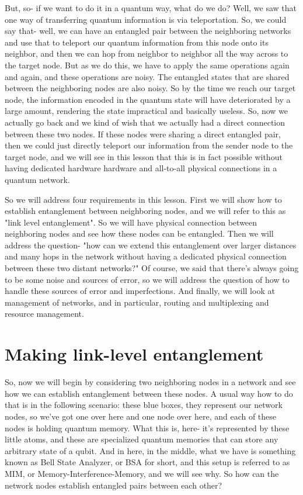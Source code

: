 But, so- if we want to do it in a quantum way, what do we do? Well, we saw that one way of transferring quantum information is via teleportation. So, we could say that- well, we can have an entangled pair between the neighboring networks and use that to teleport our quantum information from this node onto its neighbor, and then we can hop from neighbor to neighbor all the way across to the target node. But as we do this, we have to apply the same operations again and again, and these operations are noisy. The entangled states that are shared between the neighboring nodes are also noisy. So by the time we reach our target node, the information encoded in the quantum state will have deteriorated by a large amount, rendering the state impractical and basically useless. So, now we actually go back and we kind of wish that we actually had a direct connection between these two nodes. If these nodes were sharing a direct entangled pair, then we could just directly teleport our information from the sender node to the target node, and we will see in this lesson that this is in fact possible without having dedicated hardware hardware and all-to-all physical connections in a quantum network.

So we will address four requirements in this lesson. First we will show how to establish entanglement between neighboring nodes, and we will refer to this as "link level entanglement". So we will have physical connection between neighboring nodes and see how these nodes can be entangled. Then we will address the question- "how can we extend this entanglement over larger distances and many hops in the network without having a dedicated physical connection between these two distant networks?" Of course, we said that there's always going to be some noise and sources of error, so we will address the question of how to handle these sources of error and imperfections. And finally, we will look at management of networks, and in particular, routing and multiplexing and resource management.


\section{Making link-level entanglement}


So, now we will begin by considering two neighboring nodes in a network and see how we can establish entanglement between these nodes. A usual way how to do that is in the following scenario: these blue boxes, they represent our network nodes, so we've got one over here and one node over here, and each of these nodes is holding quantum memory. What this is, here- it's represented by these little atoms, and these are specialized quantum memories that can store any arbitrary state of a qubit. And in here, in the middle, what we have is something known as Bell State Analyzer, or BSA for short, and this setup is referred to as MIM, or Memory-Interference-Memory, and we will see why. So how can the network nodes establish entangled pairs between each other?

